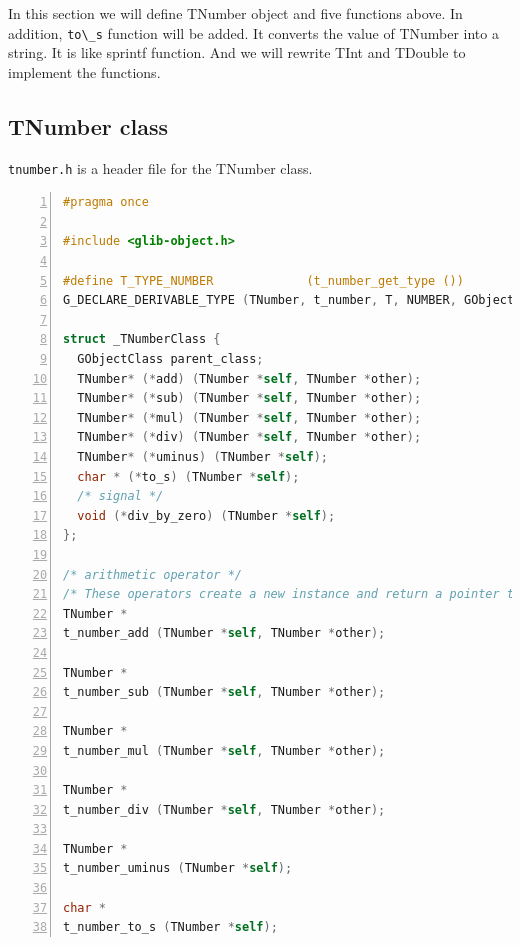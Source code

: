 In this section we will define TNumber object and five functions above.
In addition, \passthrough{\lstinline!to\_s!} function will be added. It
converts the value of TNumber into a string. It is like sprintf
function. And we will rewrite TInt and TDouble to implement the
functions.

\subsection{TNumber class}\label{tnumber-class}

\passthrough{\lstinline!tnumber.h!} is a header file for the TNumber
class.

\begin{lstlisting}[language=C, numbers=left]
#pragma once

#include <glib-object.h>

#define T_TYPE_NUMBER             (t_number_get_type ())
G_DECLARE_DERIVABLE_TYPE (TNumber, t_number, T, NUMBER, GObject)

struct _TNumberClass {
  GObjectClass parent_class;
  TNumber* (*add) (TNumber *self, TNumber *other);
  TNumber* (*sub) (TNumber *self, TNumber *other);
  TNumber* (*mul) (TNumber *self, TNumber *other);
  TNumber* (*div) (TNumber *self, TNumber *other);
  TNumber* (*uminus) (TNumber *self);
  char * (*to_s) (TNumber *self);
  /* signal */
  void (*div_by_zero) (TNumber *self);
};

/* arithmetic operator */
/* These operators create a new instance and return a pointer to it. */
TNumber *
t_number_add (TNumber *self, TNumber *other);

TNumber *
t_number_sub (TNumber *self, TNumber *other);

TNumber *
t_number_mul (TNumber *self, TNumber *other);

TNumber *
t_number_div (TNumber *self, TNumber *other);

TNumber *
t_number_uminus (TNumber *self);

char *
t_number_to_s (TNumber *self);
\end{lstlisting}

